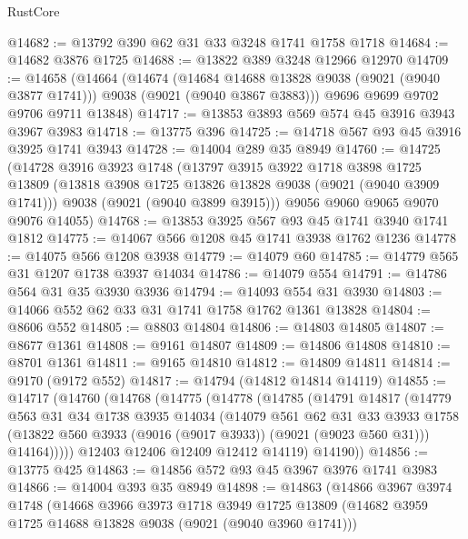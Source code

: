 \begin{lexlean}{RustCore}
\begin{coremodule}
@14682 := @13792 @390 @62 @31 @33 @3248 @1741 @1758 @1718
@14684 := @14682 @3876 @1725
@14688 := @13822 @389 @3248 @12966 @12970
@14709 := @14658
    (@14664
      (@14674
        (@14684 @14688 @13828 @9038 (@9021 (@9040 @3877 @1741)))
        @9038
        (@9021 (@9040 @3867 @3883)))
      @9696
      @9699
      @9702
      @9706
      @9711
      @13848)
@14717 := @13853 @3893 @569 @574 @45 @3916 @3943 @3967 @3983
@14718 := @13775 @396
@14725 := @14718 @567 @93 @45 @3916 @3925 @1741 @3943
@14728 := @14004 @289 @35 @8949
@14760 := @14725
    (@14728
      @3916
      @3923
      @1748
      (@13797
        @3915
        @3922
        @1718
        @3898
        @1725
        @13809
        (@13818 @3908 @1725 @13826 @13828 @9038 (@9021 (@9040 @3909 @1741)))
        @9038
        (@9021 (@9040 @3899 @3915)))
      @9056
      @9060
      @9065
      @9070
      @9076
      @14055)
@14768 := @13853 @3925 @567 @93 @45 @1741 @3940 @1741 @1812
@14775 := @14067 @566 @1208 @45 @1741 @3938 @1762 @1236
@14778 := @14075 @566 @1208 @3938
@14779 := @14079 @60
@14785 := @14779 @565 @31 @1207 @1738 @3937 @14034
@14786 := @14079 @554
@14791 := @14786 @564 @31 @35 @3930 @3936
@14794 := @14093 @554 @31 @3930
@14803 := @14066 @552 @62 @33 @31 @1741 @1758 @1762 @1361 @13828
@14804 := @8606 @552
@14805 := @8803 @14804
@14806 := @14803 @14805
@14807 := @8677 @1361
@14808 := @9161 @14807
@14809 := @14806 @14808
@14810 := @8701 @1361
@14811 := @9165 @14810
@14812 := @14809 @14811
@14814 := @9170 (@9172 @552)
@14817 := @14794 (@14812 @14814 @14119)
@14855 := @14717
    (@14760
      (@14768
        (@14775
          (@14778
            (@14785
              (@14791
                @14817
                (@14779
                  @563
                  @31
                  @34
                  @1738
                  @3935
                  @14034
                  (@14079
                    @561
                    @62
                    @31
                    @33
                    @3933
                    @1758
                    (@13822 @560 @3933 (@9016 (@9017 @3933)) (@9021 (@9023 @560 @31)))
                    @14164)))))
          @12403
          @12406
          @12409
          @12412
          @14119)
        @14190))
@14856 := @13775 @425
@14863 := @14856 @572 @93 @45 @3967 @3976 @1741 @3983
@14866 := @14004 @393 @35 @8949
@14898 := @14863
    (@14866
      @3967
      @3974
      @1748
      (@14668
        @3966
        @3973
        @1718
        @3949
        @1725
        @13809
        (@14682 @3959 @1725 @14688 @13828 @9038 (@9021 (@9040 @3960 @1741)))

\end{coremodule}
\end{lexlean}
